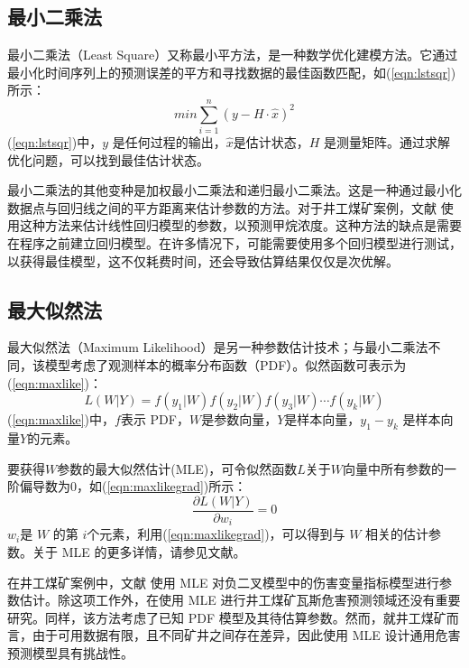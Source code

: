 \documentclass[lang=cn,a4paper,citestyle=gb7714-2015, bibstyle=gb7714-2015]{elegantpaper}
\newcommand{\mycite}[1]{\textsuperscript{\parencite{#1}}}
\begin{document}
    \subsection{最小二乘法}
    最小二乘法（Least Square）又称最小平方法，是一种数学优化建模方法。它通过最小化时间序列上的预测误差的平方和寻找数据的最佳函数匹配，如(\ref{eqn:lstsqr})所示：
    \begin{equation}
        min \sum_{i=1}^{n}(y - H\cdot \hat{x})^2
        \label{eqn:lstsqr}
    \end{equation}
    (\ref{eqn:lstsqr})中，$y$ 是任何过程的输出，$\hat{x}$是估计状态，$H$ 是测量矩阵。通过求解优化问题，可以找到最佳估计状态。

    \bigskip
    最小二乘法的其他变种是加权最小二乘法和递归最小二乘法。这是一种通过最小化数据点与回归线之间的平方距离来估计参数的方法。对于井工煤矿案例，文献\mycite{ref81} 使用这种方法来估计线性回归模型的参数，以预测甲烷浓度。这种方法的缺点是需要在程序之前建立回归模型。在许多情况下，可能需要使用多个回归模型进行测试，以获得最佳模型，这不仅耗费时间，还会导致估算结果仅仅是次优解。

    \subsection{最大似然法}
    最大似然法（Maximum Likelihood）是另一种参数估计技术；与最小二乘法不同，该模型考虑了观测样本的概率分布函数（PDF）。似然函数可表示为(\ref{eqn:maxlike})：
    \begin{equation}
        L(W|Y) = f(y_1|W)f(y_2|W)f(y_3|W)\cdots f(y_k|W)
        \label{eqn:maxlike}
    \end{equation}
    (\ref{eqn:maxlike})中，$f$表示 PDF，$W$是参数向量，$Y$是样本向量，$y_1 - y_k$ 是样本向量$Y$的元素。

    要获得$W$参数的最大似然估计(MLE)，可令似然函数$L$关于$W$向量中所有参数的一阶偏导数为0，如(\ref{eqn:maxlikegrad})所示：
    \begin{equation}
        \dfrac{\partial L(W|Y)}{\partial w_i}=0
        \label{eqn:maxlikegrad}
    \end{equation}
    $w_i$是 $W$ 的第 $i$个元素，利用(\ref{eqn:maxlikegrad})，可以得到与 $W$ 相关的估计参数。关于 MLE 的更多详情，请参见文献\mycite{Myung2002}。

    在井工煤矿案例中，文献\mycite{Asfaw2013} 使用 MLE 对负二叉模型中的伤害变量指标模型进行参数估计。除这项工作外，在使用 MLE 进行井工煤矿瓦斯危害预测领域还没有重要研究。同样，该方法考虑了已知 PDF 模型及其待估算参数。然而，就井工煤矿而言，由于可用数据有限，且不同矿井之间存在差异，因此使用 MLE 设计通用危害预测模型具有挑战性。
\end{document}

